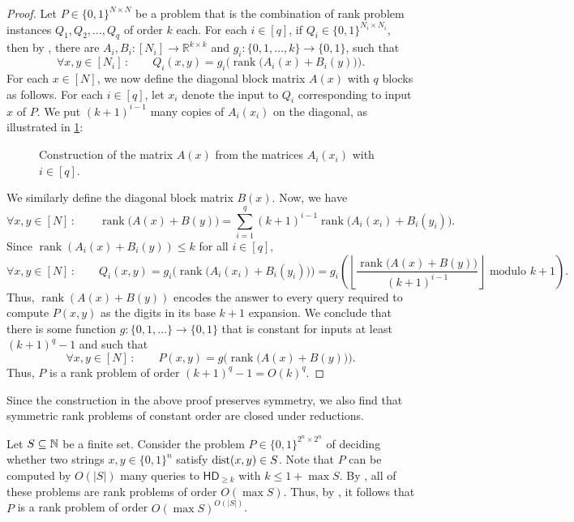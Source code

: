 \documentclass{article}
\DeclareMathOperator{\rank}{rank}
\newcommand{\HD}[1]{\mathsf{HD}_{#1}}
\newcommand{\R}{\mathbb{R}}
\begin{document}
\begin{proof}
	Let $P\in \{0,1\}^{N\times N}$ be a problem that is the combination of rank problem instances $Q_1,Q_2,\dots, Q_q$ of order $k$ each. For each $i\in [q]$, if $Q_i\in \{0,1\}^{N_i\times N_i}$, then by , there are $A_i,B_i\colon [N_i]\to
    \R^{k\times k}$ and $g_i\colon \{0,1,\dots, k\}\to \{0,1\}$, such that 
\[
	\forall x,y\in[N_i]\,\colon\qquad  Q_i(x,y) = g_i\Big(\rank\!\big(A_i(x)+ B_i(y)\big)\Big).
\]
For each $x\in [N]$, we now define the diagonal block matrix $A(x)$ with $q$
blocks as follows. For each $i\in [q]$, let $x_i$ denote the input to $Q_i$
corresponding to input $x$ of $P$. We put $(k+1)^{i-1}$ many copies of
$A_i(x_i)$ on the diagonal, as illustrated in \cref{fig:rank-reduction}:
	
	\begin{figure}[H]
		\begin{center}
			
		\end{center}
		\caption{Construction of the matrix $A(x)$ from the matrices $A_i(x_i)$ with $i\in [q]$.}
        \label{fig:rank-reduction}
	\end{figure}
\noindent
We similarly define the diagonal block matrix $B(x)$. Now, we have
\[
    \forall x,y\in[N]\,\colon\qquad \rank\!\big(A(x)+B(y)\big) = \sum_{i = 1}^q (k+1)^{i-1}\rank\!\Big(A_i(x_i)+B_i(y_i)\Big).
\]
	Since $\rank(A_i(x)+B_i(y))\leq k$ for all $i\in[q]$,
\[
	\forall x,y\in[N]\,\colon\qquad  Q_i(x,y) = g_i\Big(\rank\!\big(A_i(x_i)+B_i(y_i)\big)\Big) = g_i\left(\left\lfloor\frac{\rank\!\big(A(x)+B(y)\big)}{(k+1)^{i-1}}\right\rfloor \text{ modulo }k+1\right).
\]
	Thus, $\rank(A(x)+B(y))$ encodes the answer to every query required to
	compute $P(x,y)$ as the digits in its base $k+1$ expansion. We conclude that there is some function $g:\{0,1,\dots\}\to\{0,1\}$ that is constant for inputs at least $(k+1)^q-1$ and such that
	\[
	\forall x,y\in[N]\,\colon\qquad P(x,y) = g\Big(\rank\!\big(A(x)+B(y)\big)\Big).
	\]
	Thus, $P$ is a rank problem of order $(k+1)^q-1 = O(k)^q$.
\end{proof}

\begin{remark} \label{rem:symmetry}
	Since the construction in the above proof preserves symmetry, we also find that symmetric rank problems of constant order are closed under reductions.
\end{remark}

\begin{example}
	Let $S\subseteq \mathbb{N}$ be a finite set. Consider the problem $P\in\{0,1\}^{2^n\times 2^n}$ of deciding whether two strings $x,y\in \{0,1\}^n$ satisfy $\operatorname{dist}(x,y)\in S$. Note that $P$ can be computed by $O(|S|)$ many queries to $\HD{\geq k}$ with $k\leq 1+\max S$. By , all of these problems are rank problems of order $O(\max S)$. Thus, by , it follows that $P$ is a rank problem of order $O(\max S)^{O(|S|)}$.
\end{example}
\end{document}
